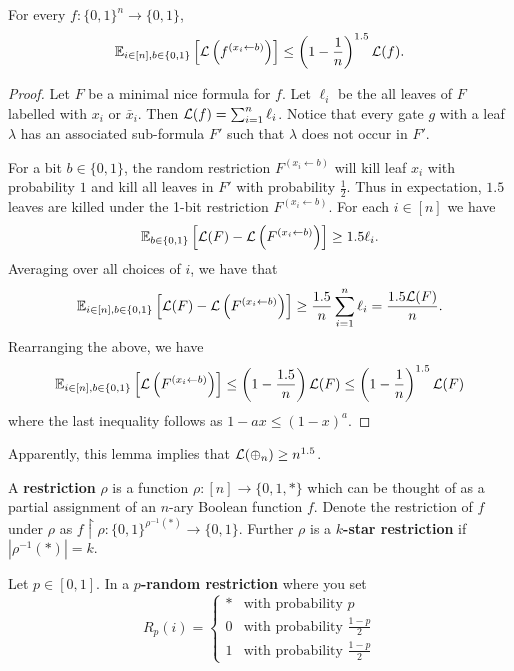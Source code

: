 \documentclass[11pt]{article}
\begin{document}
	\begin{lemma}
		\label{lem:onebitrestrictionbd}
		For every $f: \{0,1\}^n \rightarrow \{0,1\}$,
		\[\operatorname{\mathbb{E}}_{i \in [n], b\in \{0,1\}}\left[\mathcal{L}\left(f^{(x_i \leftarrow b)}\right)\right] \leq \left(1 - \frac{1}{n}\right)^{1.5} \mathcal{L}(f).\]
	\end{lemma}
	\begin{proof}
		Let $F$ be a minimal nice formula for $f$. Let $\ell_i$ be the all leaves of $F$ labelled with $x_i$ or $\bar{x}_i$. Then $\mathcal{L}(f) = \sum_{i = 1}^{n} \ell_i$.  Notice that every gate $g$ with a leaf $\lambda$ has an associated sub-formula $F'$ such that $\lambda$ does not occur in $F'$.
		
		For a bit $b \in \{0,1\}$, the random restriction $F^{(x_i \leftarrow b)}$ will kill leaf $x_i$ with probability $1$ and kill all leaves in $F'$ with probability $\frac{1}{2}$. Thus in expectation, $1.5$ leaves are killed under the 1-bit restriction $F^{(x_i \leftarrow b)}$. For each $i \in [n]$ we have
		\[\operatorname{\mathbb{E}}_{b \in \{0,1\}}\left[\mathcal{L}(F) - \mathcal{L}\left(F^{(x_i \leftarrow b)}\right)\right] \geq 1.5 \ell_i.\] 
		Averaging over all choices of $i$, we have that 
		\[\operatorname{\mathbb{E}}_{i \in [n], b \in \{0,1\}}\left[\mathcal{L}(F) - \mathcal{L}\left(F^{(x_i \leftarrow b)}\right)\right] \geq \frac{1.5}{n}\sum_{i = 1}^{n} \ell_i = \frac{1.5\mathcal{L}(F)}{n}.\]
		Rearranging the above, we have
		\[\operatorname{\mathbb{E}}_{i \in [n], b \in \{0,1\}}\left[\mathcal{L}\left(F^{(x_i \leftarrow b)}\right)\right] \leq \left(1 - \frac{1.5}{n}\right)\mathcal{L}(F) \leq \left(1 - \frac{1}{n}\right)^{1.5} \mathcal{L}(F)\]
		where the last inequality follows as $1 - ax \leq (1 - x)^a$.
	\end{proof}
	Apparently, this lemma implies that $\mathcal{L}(\operatorname{\oplus}_n) \geq n^{1.5}$.
	
	\begin{definition}
		\label{def:restrictions}
		A \textbf{restriction} $\rho$ is a function $\rho: [n] \rightarrow \{0,1,*\}$ which can be thought of as a partial assignment of an $n$-ary Boolean function $f$. Denote the restriction of $f$ under $\rho$ as $f \upharpoonright \rho: \{0,1\}^{\rho^{-1}(*)} \rightarrow \{0,1\}$. Further $\rho$ is a \textbf{$k$-star restriction} if $|\rho^{-1}(*)| = k$. 
		
		Let $p\in [0,1]$. In a \textbf{$p$-random restriction} where you set
		\[R_p(i) = \begin{cases}
		*&\mbox{with probability } p\\
		0&\mbox{with probability } \frac{1-p}{2}\\
		1&\mbox{with probability } \frac{1-p}{2}
		\end{cases}\]
	\end{definition}
	
\end{document}
